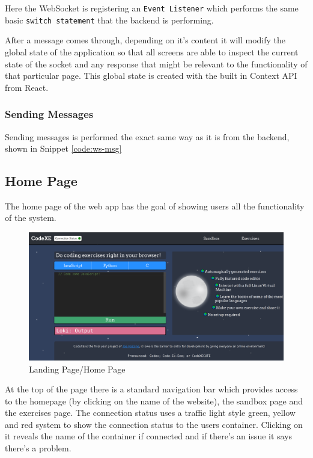 Here the WebSocket is registering an \texttt{Event Listener} which performs the same basic \texttt{switch statement} that the backend is performing.

After a message comes through, depending on it's content it will modify the global state of the application so that all screens are able to inspect the current state of the socket and any response that might be relevant to the functionality of that particular page. This global state is created with the built in Context API from React.

\subsubsection{Sending Messages}

Sending messages is performed the exact same way as it is from the backend, shown in Snippet \ref{code:ws-msg}

\pagebreak

\subsection{Home Page}

The home page of the web app has the goal of showing users all the functionality of the system.

\begin{figure}[h!]
    \centering
    \includegraphics[width=\linewidth]{res/home_page.png}
    \caption{Landing Page/Home Page}
    \label{fig:homepage}
\end{figure}

At the top of the page there is a standard navigation bar which provides access to the homepage (by clicking on the name of the website), the sandbox page and the exercises page. The connection status uses a traffic light style green, yellow and red system to show the connection status to the users container. Clicking on it reveals the name of the container if connected and if there's an issue it says there's a problem.

